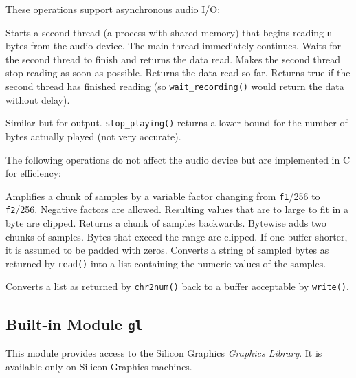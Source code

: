 These operations support asynchronous audio I/O:
\begin{description}
Starts a second thread (a process with shared memory) that begins reading
{\tt n}
bytes from the audio device.
The main thread immediately continues.
Waits for the second thread to finish and returns the data read.
Makes the second thread stop reading as soon as possible.
Returns the data read so far.
Returns true if the second thread has finished reading (so
{\tt wait\_recording()} would return the data without delay).
\item[{\tt start\_playing(chunk)}, {\tt wait\_playing()},
{\tt stop\_playing()}, {\tt poll\_playing()}]
\begin{sloppypar}
Similar but for output.
{\tt stop\_playing()}
returns a lower bound for the number of bytes actually played (not very
accurate).
\end{sloppypar}
\end{description}

The following operations do not affect the audio device but are
implemented in C for efficiency:
\begin{description}
Amplifies a chunk of samples by a variable factor changing from
{\tt f1}/256 to {\tt f2}/256.
Negative factors are allowed.
Resulting values that are to large to fit in a byte are clipped.         
Returns a chunk of samples backwards.
Bytewise adds two chunks of samples.
Bytes that exceed the range are clipped.
If one buffer shorter, it is assumed to be padded with zeros.
Converts a string of sampled bytes as returned by {\tt read()} into
a list containing the numeric values of the samples.
\begin{sloppypar}
Converts a list as returned by
{\tt chr2num()}
back to a buffer acceptable by
{\tt write()}.
\end{sloppypar}
\end{description}

\subsection{Built-in Module {\tt gl}}

This module provides access to the Silicon Graphics
{\em Graphics Library}.
It is available only on Silicon Graphics machines.

